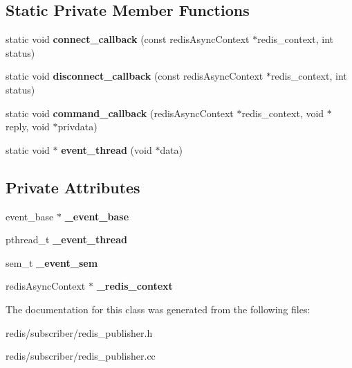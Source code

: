 \subsection*{Static Private Member Functions}
\begin{DoxyCompactItemize}
\item 
\mbox{\label{classCRedisPublisher_a12d4cfd9ca003dfdcc47695f7f840092}} 
static void {\bfseries connect\+\_\+callback} (const redis\+Async\+Context $\ast$redis\+\_\+context, int status)
\item 
\mbox{\label{classCRedisPublisher_ac801e3e460d44b75452831901fcae604}} 
static void {\bfseries disconnect\+\_\+callback} (const redis\+Async\+Context $\ast$redis\+\_\+context, int status)
\item 
\mbox{\label{classCRedisPublisher_ac223c0ccd3e246f513341680edda6c46}} 
static void {\bfseries command\+\_\+callback} (redis\+Async\+Context $\ast$redis\+\_\+context, void $\ast$reply, void $\ast$privdata)
\item 
\mbox{\label{classCRedisPublisher_abdc8924997c801b5f0aad2107c95ca6f}} 
static void $\ast$ {\bfseries event\+\_\+thread} (void $\ast$data)
\end{DoxyCompactItemize}
\subsection*{Private Attributes}
\begin{DoxyCompactItemize}
\item 
\mbox{\label{classCRedisPublisher_ab34e87bdea5ef0c98f676077bf3c2e3f}} 
event\+\_\+base $\ast$ {\bfseries \+\_\+event\+\_\+base}
\item 
\mbox{\label{classCRedisPublisher_a9e2d7f6e5baa11065b9a88ad0139ed18}} 
pthread\+\_\+t {\bfseries \+\_\+event\+\_\+thread}
\item 
\mbox{\label{classCRedisPublisher_aac6ab16975e7015913ccb236c7e707ed}} 
sem\+\_\+t {\bfseries \+\_\+event\+\_\+sem}
\item 
\mbox{\label{classCRedisPublisher_a02c6968c1e60451e0278e4c1df2f8da0}} 
redis\+Async\+Context $\ast$ {\bfseries \+\_\+redis\+\_\+context}
\end{DoxyCompactItemize}


The documentation for this class was generated from the following files\+:\begin{DoxyCompactItemize}
\item 
redis/subscriber/redis\+\_\+publisher.\+h\item 
redis/subscriber/redis\+\_\+publisher.\+cc\end{DoxyCompactItemize}
